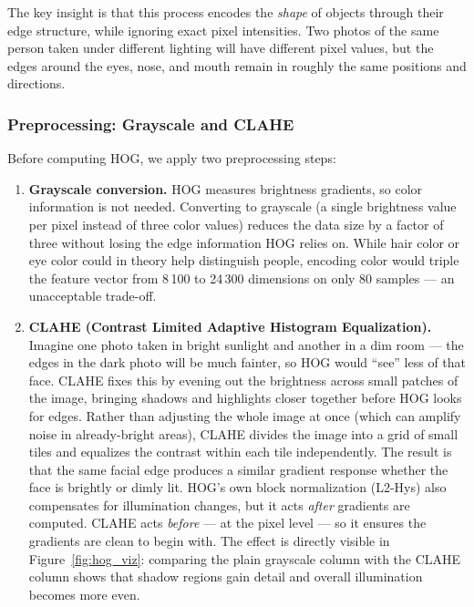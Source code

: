 \documentclass[a4paper,10pt]{article}
\begin{document}
The key insight is that this process encodes the \textit{shape} of objects through their edge structure, while ignoring exact pixel intensities. Two photos of the same person taken under different lighting will have different pixel values, but the edges around the eyes, nose, and mouth remain in roughly the same positions and directions.

\subsubsection{Preprocessing: Grayscale and CLAHE}

Before computing HOG, we apply two preprocessing steps:

\begin{enumerate}
    \item \textbf{Grayscale conversion.} HOG measures brightness gradients, so color information is not needed. Converting to grayscale (a single brightness value per pixel instead of three color values) reduces the data size by a factor of three without losing the edge information HOG relies on. While hair color or eye color could in theory help distinguish people, encoding color would triple the feature vector from 8\,100 to 24\,300 dimensions on only 80 samples --- an unacceptable trade-off.

    \item \textbf{CLAHE (Contrast Limited Adaptive Histogram Equalization).} Imagine one photo taken in bright sunlight and another in a dim room --- the edges in the dark photo will be much fainter, so HOG would ``see'' less of that face. CLAHE fixes this by evening out the brightness across small patches of the image, bringing shadows and highlights closer together before HOG looks for edges. Rather than adjusting the whole image at once (which can amplify noise in already-bright areas), CLAHE divides the image into a grid of small tiles and equalizes the contrast within each tile independently. The result is that the same facial edge produces a similar gradient response whether the face is brightly or dimly lit. HOG's own block normalization (L2-Hys) also compensates for illumination changes, but it acts \textit{after} gradients are computed. CLAHE acts \textit{before} --- at the pixel level --- so it ensures the gradients are clean to begin with. The effect is directly visible in Figure~\ref{fig:hog_viz}: comparing the plain grayscale column with the CLAHE column shows that shadow regions gain detail and overall illumination becomes more even.
\end{enumerate}
\end{document}
